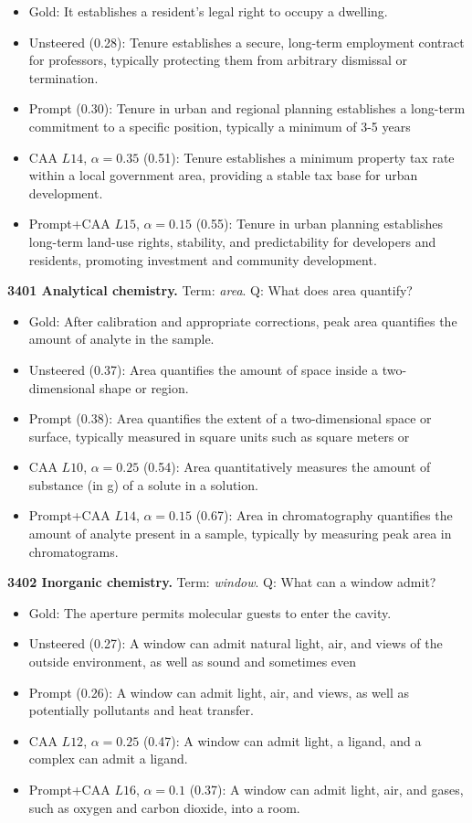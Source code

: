 \begin{itemize}\setlength{\itemsep}{0.15em}\setlength{\parsep}{0pt}\setlength{\topsep}{0.2em}
\item Gold: It establishes a resident's legal right to occupy a dwelling.
\item Unsteered (0.28): Tenure establishes a secure, long-term employment contract for professors, typically protecting them from arbitrary dismissal or termination.
\item Prompt (0.30): Tenure in urban and regional planning establishes a long-term commitment to a specific position, typically a minimum of 3-5 years
\item CAA $L14$, $\alpha=0.35$ (0.51): Tenure establishes a minimum property tax rate within a local government area, providing a stable tax base for urban development.
\item Prompt+CAA $L15$, $\alpha=0.15$ (0.55): Tenure in urban planning establishes long-term land-use rights, stability, and predictability for developers and residents, promoting investment and community development.
\end{itemize}
\medskip\noindent\textbf{3401 Analytical chemistry.} Term: \emph{area}.
Q: What does area quantify?
\begin{itemize}\setlength{\itemsep}{0.15em}\setlength{\parsep}{0pt}\setlength{\topsep}{0.2em}
\item Gold: After calibration and appropriate corrections, peak area quantifies the amount of analyte in the sample.
\item Unsteered (0.37): Area quantifies the amount of space inside a two-dimensional shape or region.
\item Prompt (0.38): Area quantifies the extent of a two-dimensional space or surface, typically measured in square units such as square meters or
\item CAA $L10$, $\alpha=0.25$ (0.54): Area quantitatively measures the amount of substance (in g) of a solute in a solution.
\item Prompt+CAA $L14$, $\alpha=0.15$ (0.67): Area in chromatography quantifies the amount of analyte present in a sample, typically by measuring peak area in chromatograms.
\end{itemize}
\medskip\noindent\textbf{3402 Inorganic chemistry.} Term: \emph{window}.
Q: What can a window admit?
\begin{itemize}\setlength{\itemsep}{0.15em}\setlength{\parsep}{0pt}\setlength{\topsep}{0.2em}
\item Gold: The aperture permits molecular guests to enter the cavity.
\item Unsteered (0.27): A window can admit natural light, air, and views of the outside environment, as well as sound and sometimes even
\item Prompt (0.26): A window can admit light, air, and views, as well as potentially pollutants and heat transfer.
\item CAA $L12$, $\alpha=0.25$ (0.47): A window can admit light, a ligand, and a complex can admit a ligand.
\item Prompt+CAA $L16$, $\alpha=0.1$ (0.37): A window can admit light, air, and gases, such as oxygen and carbon dioxide, into a room.
\end{itemize}
